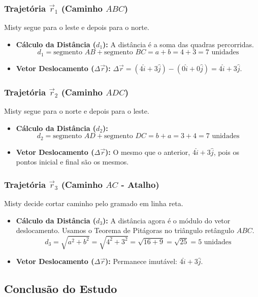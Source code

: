 \documentclass[11pt,a4paper]{article}
\begin{document}
\subsubsection{Trajetória $\vec{r}_1$ (Caminho $ABC$)}
Misty segue para o leste e depois para o norte.
\begin{itemize}
    \item \textbf{Cálculo da Distância ($d_1$):} A distância é a soma das quadras percorridas.
    $$d_1 = \text{segmento } AB + \text{segmento } BC = a + b = 4 + 3 = 7 \text{ unidades}$$
    \item \textbf{Vetor Deslocamento ($\Delta \vec{r}$):} $\Delta \vec{r} = (4\hat{i} + 3\hat{j}) - (0\hat{i} + 0\hat{j}) = 4\hat{i} + 3\hat{j}$.
\end{itemize}

\subsubsection{Trajetória $\vec{r}_2$ (Caminho $ADC$)}
Misty segue para o norte e depois para o leste.
\begin{itemize}
    \item \textbf{Cálculo da Distância ($d_2$):}
    $$d_2 = \text{segmento } AD + \text{segmento } DC = b + a = 3 + 4 = 7 \text{ unidades}$$
    \item \textbf{Vetor Deslocamento ($\Delta \vec{r}$):} O mesmo que o anterior, $4\hat{i} + 3\hat{j}$, pois os pontos inicial e final são os mesmos.
\end{itemize}

\subsubsection{Trajetória $\vec{r}_3$ (Caminho $AC$ - Atalho)}
Misty decide cortar caminho pelo gramado em linha reta.
\begin{itemize}
    \item \textbf{Cálculo da Distância ($d_3$):} A distância agora é o módulo do vetor deslocamento. Usamos o Teorema de Pitágoras no triângulo retângulo $ABC$.
    $$d_3 = \sqrt{a^2 + b^2} = \sqrt{4^2 + 3^2} = \sqrt{16 + 9} = \sqrt{25} = 5 \text{ unidades}$$
    \item \textbf{Vetor Deslocamento ($\Delta \vec{r}$):} Permanece imutável: $4\hat{i} + 3\hat{j}$.
\end{itemize}

\subsection{Conclusão do Estudo}
\end{document}
